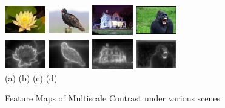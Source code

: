 \documentclass[10pt,twocolumn,letterpaper]{article}
\newcommand{\hs}{\hspace{0.58in}}
\begin{document}
\begin{figure}
    \begin{center}
    \includegraphics[width=0.7in,height=0.54in]{./Figures/contrast/1orig.jpg}
    \includegraphics[width=0.7in,height=0.54in]{./Figures/contrast/2orig.jpg}
    \includegraphics[width=0.7in,height=0.54in]{./Figures/contrast/3orig.jpg}
    \includegraphics[width=0.7in,height=0.54in]{./Figures/contrast/4orig.jpg}\\
    \includegraphics[width=0.7in,height=0.54in]{./Figures/contrast/1cont.jpg}
    \includegraphics[width=0.7in,height=0.54in]{./Figures/contrast/2cont.jpg}
    \includegraphics[width=0.7in,height=0.54in]{./Figures/contrast/3cont.jpg}
    \includegraphics[width=0.7in,height=0.54in]{./Figures/contrast/4cont.jpg}\\
    \footnotesize \hspace{0.1cm} (a) \hs (b) \hs  (c) \hs (d) \\
\caption{Feature Maps of Multiscale Contrast under various scenes}
    \end{center}
\end{figure}
\end{document}
